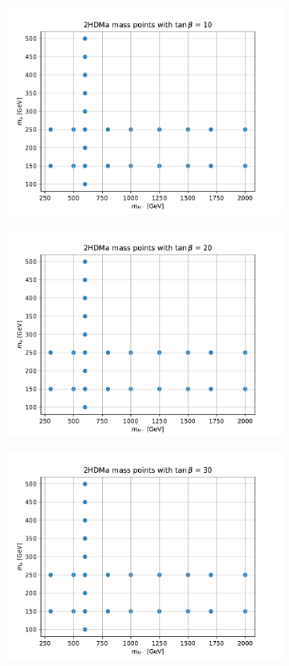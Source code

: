 \documentclass[12pt, a4paper]{book}
\begin{document}
\begin{figure}[!ht]
\begin{subfigure}[b]{0.45\textwidth}
        \includegraphics[width=\textwidth]{2HDM_tb10.pdf}    
    \end{subfigure}
    \begin{subfigure}[b]{0.45\textwidth}
        \includegraphics[width=\textwidth]{2HDM_tb20.pdf}    
    \end{subfigure}
    \begin{subfigure}[b]{0.45\textwidth}
        \includegraphics[width=\textwidth]{2HDM_tb30.pdf}    

\end{subfigure}
\end{figure}
\end{document}
